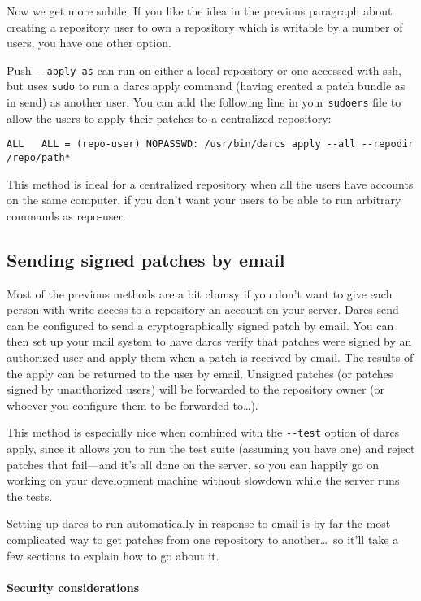 \documentclass{book}
\begin{document}
Now we get more subtle.  If you like the idea in the previous paragraph
about creating a repository user to own a repository which is writable by
a number of users, you have one other option.

Push \verb!--apply-as! can run on either a local repository or one accessed
with ssh, but uses \verb!sudo! to run a darcs apply command (having created
a patch bundle as in send) as another user.  You can add the following line
in your \verb|sudoers| file to allow the users to apply their patches to a
centralized repository:
{\small
\begin{verbatim}
ALL   ALL = (repo-user) NOPASSWD: /usr/bin/darcs apply --all --repodir /repo/path*
\end{verbatim}
}
This method is ideal for a centralized repository when all the users have
accounts on the same computer, if you don't want your users to be able to
run arbitrary commands as repo-user.

\subsection{Sending signed patches by email}

Most of the previous methods are a bit clumsy if you don't want to give
each person with write access to a repository an account on your server.  Darcs
send can be configured to send a cryptographically signed patch by email.
You can then set up your mail system to have darcs verify that patches were
signed by an authorized user and apply them when a patch is received by
email.  The results of the apply can be returned to the user by email.
Unsigned patches (or patches signed by unauthorized users) will be
forwarded to the repository owner (or whoever you configure them to be
forwarded to\ldots).

This method is especially nice when combined with the \verb!--test! option
of darcs apply, since it allows you to run the test suite (assuming you
have one) and reject patches that fail---and it's all done on the server,
so you can happily go on working on your development machine without
slowdown while the server runs the tests.

Setting up darcs to run automatically in response to email is by far the
most complicated way to get patches from one repository to another\ldots\ so it'll
take a few sections to explain how to go about it.

\paragraph{Security considerations}
\end{document}
